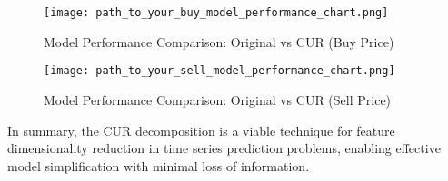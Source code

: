 \documentclass[a4paper,12pt]{article}
\begin{document}
\begin{figure}[h]
    \centering
    \texttt{[image: path\_to\_your\_buy\_model\_performance\_chart.png]}
    \caption{Model Performance Comparison: Original vs CUR (Buy Price)}
\end{figure}

\begin{figure}[h]
    \centering
    \texttt{[image: path\_to\_your\_sell\_model\_performance\_chart.png]}
    \caption{Model Performance Comparison: Original vs CUR (Sell Price)}
\end{figure}

\vspace{1em}
\noindent
In summary, the CUR decomposition is a viable technique for feature dimensionality reduction in time series prediction problems, enabling effective model simplification with minimal loss of information.
\end{document}
